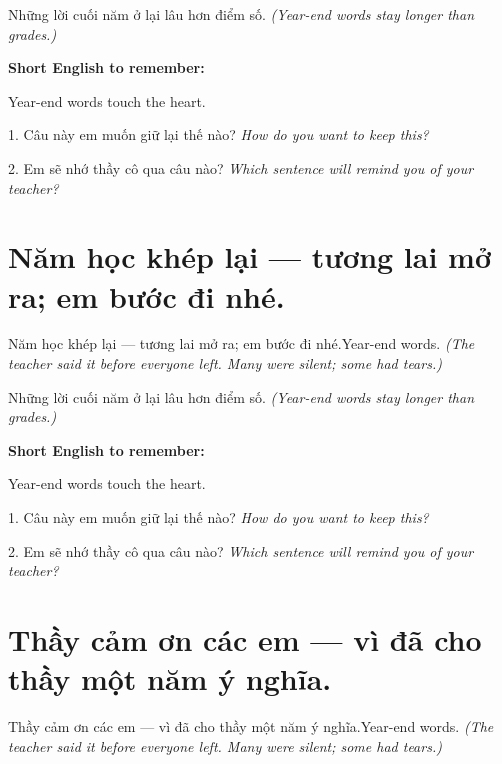 \begin{baihoc}
Những lời cuối năm ở lại lâu hơn điểm số.
\textit{(Year-end words stay longer than grades.)}
\end{baihoc}

\begin{ghinhoanh}
\textbf{Short English to remember:}

Year-end words touch the heart.

\end{ghinhoanh}

\begin{tuhocnhanh}
1. Câu này em muốn giữ lại thế nào? \textit{How do you want to keep this?}

2. Em sẽ nhớ thầy cô qua câu nào? \textit{Which sentence will remind you of your teacher?}
\end{tuhocnhanh}
\ngancach


\section{Năm học khép lại — tương lai mở ra; em bước đi nhé.}
\begin{truyen}{Năm học khép lại — tương lai mở ra; em bước đi nhé.}{Year-end words.}
\textit{(The teacher said it before everyone left. Many were silent; some had tears.)}
\end{truyen}

\begin{baihoc}
Những lời cuối năm ở lại lâu hơn điểm số.
\textit{(Year-end words stay longer than grades.)}
\end{baihoc}

\begin{ghinhoanh}
\textbf{Short English to remember:}

Year-end words touch the heart.

\end{ghinhoanh}

\begin{tuhocnhanh}
1. Câu này em muốn giữ lại thế nào? \textit{How do you want to keep this?}

2. Em sẽ nhớ thầy cô qua câu nào? \textit{Which sentence will remind you of your teacher?}
\end{tuhocnhanh}
\ngancach


\section{Thầy cảm ơn các em — vì đã cho thầy một năm ý nghĩa.}
\begin{truyen}{Thầy cảm ơn các em — vì đã cho thầy một năm ý nghĩa.}{Year-end words.}
\textit{(The teacher said it before everyone left. Many were silent; some had tears.)}
\end{truyen}

